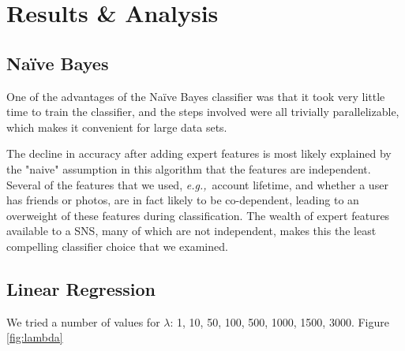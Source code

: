 \documentclass[preprint]{acm_proc_article-sp}
\newcommand{\eg}{{\em e.g.,}~}
\begin{document}
\section{Results \& Analysis}

\subsection{Na\"ive Bayes}


One of the advantages of the Na\"ive Bayes classifier was that it took very little time to train the classifier, 
and the steps involved were all trivially parallelizable, which makes it convenient for large data sets.

The decline in accuracy after adding expert features is most likely explained by the "naive" assumption in this 
algorithm that the features are independent. Several of the features that we used, \eg{account lifetime, 
and whether a user has friends or photos}, are in fact likely to be co-dependent, leading to an overweight of 
these features during classification. The wealth of expert features available to a SNS, many of which are 
not independent, makes this the least compelling classifier choice that we examined.

\subsection{Linear Regression}

We tried a number of values for $\lambda$: 1, 10, 50, 100, 500, 1000, 1500, 3000. Figure \ref{fig:lambda}
\end{document}
